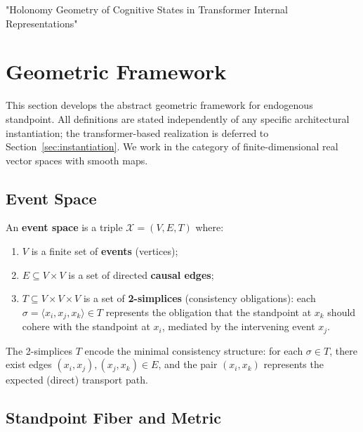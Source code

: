 "Holonomy Geometry of Cognitive States in Transformer Internal Representations"

\section{Geometric Framework}
\label{sec:geometric-framework}

This section develops the abstract geometric framework for endogenous standpoint.
All definitions are stated independently of any specific architectural instantiation;
the transformer-based realization is deferred to Section~\ref{sec:instantiation}.
We work in the category of finite-dimensional real vector spaces with smooth maps.

\subsection{Event Space}
\label{sec:event-space-abstract}

\begin{definition}
\label{def:event-space}
An \textbf{event space} is a triple $\mathcal{X} = (V, E, T)$ where:
\begin{enumerate}
    \item $V$ is a finite set of \textbf{events} (vertices);
    \item $E \subseteq V \times V$ is a set of directed \textbf{causal edges};
    \item $T \subseteq V \times V \times V$ is a set of \textbf{2-simplices} (consistency
    obligations): each $\sigma = \langle x_i, x_j, x_k \rangle \in T$ represents the
    obligation that the standpoint at $x_k$ should cohere with the standpoint at $x_i$,
    mediated by the intervening event $x_j$.
\end{enumerate}
The 2-simplices $T$ encode the minimal consistency structure: for each $\sigma \in T$,
there exist edges $(x_i, x_j), (x_j, x_k) \in E$, and the pair $(x_i, x_k)$ represents
the expected (direct) transport path.
\end{definition}

\subsection{Standpoint Fiber and Metric}
\label{sec:fiber-abstract}

